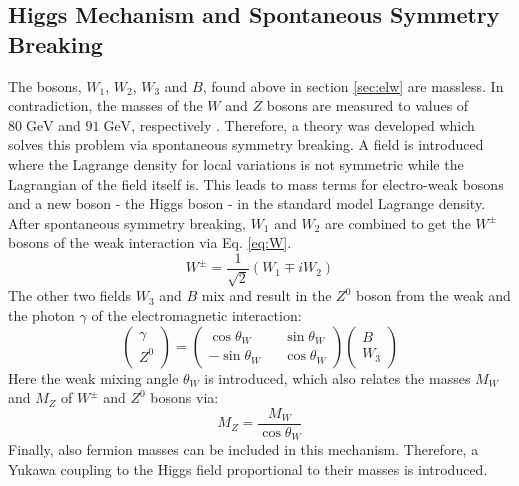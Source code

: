 	\subsection{Higgs Mechanism and Spontaneous Symmetry Breaking}
	\label{sec:higgs}
	The bosons, $W_1$, $W_2$, $W_3$ and $B$, found above in section \ref{sec:elw} are massless. In contradiction, the masses of the $W$ and $Z$ bosons are measured to values of $80\;\text{GeV}$ and $91\;\text{GeV}$, respectively \cite{pdg2016}. Therefore, a theory was developed which solves this problem via spontaneous symmetry breaking. A field is introduced where the Lagrange density for local variations is not symmetric while the Lagrangian of the field itself is. This leads to mass terms for electro-weak bosons and a new boson - the Higgs boson - in the standard model Lagrange density. After spontaneous symmetry breaking, $W_1$ and $W_2$ are combined to get the $W^\pm$ bosons of the weak interaction via Eq. \ref{eq:W}.
	\begin{equation}
	W^\pm = \frac{1}{\sqrt{2}}(W_1 \mp i W_2)
	\label{eq:W}
	\end{equation}
	The other two fields $W_3$ and $B$ mix and result in the $Z^0$ boson from the weak and the photon $\gamma$ of the electromagnetic interaction:
	\begin{equation}
	\begin{pmatrix}\gamma \\ Z^0\end{pmatrix} =
	\begin{pmatrix}
	\cos \theta_W && \sin \theta_W \\
	-\sin \theta_W && \cos \theta_W 
	\end{pmatrix}
	\begin{pmatrix}B \\ W_3\end{pmatrix}
	\label{eq:Z}
	\end{equation}	
	Here the weak mixing angle $\theta_W$ is introduced, which also relates the masses $M_W$ and $M_Z$ of $W^\pm$ and $Z^0$ bosons via:
	\begin{equation}
	M_Z = \frac{M_W}{\cos \theta_W}
	\end{equation}
	Finally, also fermion masses can be included in this mechanism. Therefore, a Yukawa coupling to the Higgs field proportional to their masses is introduced. 
	

		
